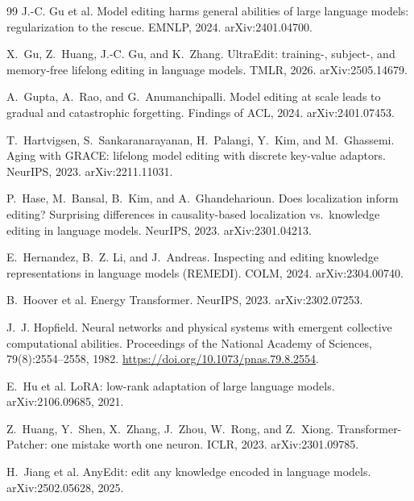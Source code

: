 \documentclass[10pt,twocolumn]{article}
\theoremstyle{remark}
\begin{document}
\begin{thebibliography}{99}
J.-C. Gu et al.
\newblock Model editing harms general abilities of large language models: regularization to the rescue.
\newblock EMNLP, 2024. arXiv:2401.04700.

X.~Gu, Z.~Huang, J.-C. Gu, and K.~Zhang.
\newblock UltraEdit: training-, subject-, and memory-free lifelong editing in language models.
\newblock TMLR, 2026. arXiv:2505.14679.

A.~Gupta, A.~Rao, and G.~Anumanchipalli.
\newblock Model editing at scale leads to gradual and catastrophic forgetting.
\newblock Findings of ACL, 2024. arXiv:2401.07453.

T.~Hartvigsen, S.~Sankaranarayanan, H.~Palangi, Y.~Kim, and M.~Ghassemi.
\newblock Aging with GRACE: lifelong model editing with discrete key-value adaptors.
\newblock NeurIPS, 2023. arXiv:2211.11031.

P.~Hase, M.~Bansal, B.~Kim, and A.~Ghandeharioun.
\newblock Does localization inform editing? Surprising differences in causality-based localization vs.\ knowledge editing in language models.
\newblock NeurIPS, 2023. arXiv:2301.04213.

E.~Hernandez, B.~Z. Li, and J.~Andreas.
\newblock Inspecting and editing knowledge representations in language models (REMEDI).
\newblock COLM, 2024. arXiv:2304.00740.

B.~Hoover et al.
\newblock Energy Transformer.
\newblock NeurIPS, 2023. arXiv:2302.07253.

J.~J. Hopfield.
\newblock Neural networks and physical systems with emergent collective computational abilities.
\newblock Proceedings of the National Academy of Sciences, 79(8):2554--2558, 1982. \url{https://doi.org/10.1073/pnas.79.8.2554}.

E.~Hu et al.
\newblock LoRA: low-rank adaptation of large language models.
\newblock arXiv:2106.09685, 2021.

Z.~Huang, Y.~Shen, X.~Zhang, J.~Zhou, W.~Rong, and Z.~Xiong.
\newblock Transformer-Patcher: one mistake worth one neuron.
\newblock ICLR, 2023. arXiv:2301.09785.

H.~Jiang et al.
\newblock AnyEdit: edit any knowledge encoded in language models.
\newblock arXiv:2502.05628, 2025.


\end{thebibliography}
\end{document}
